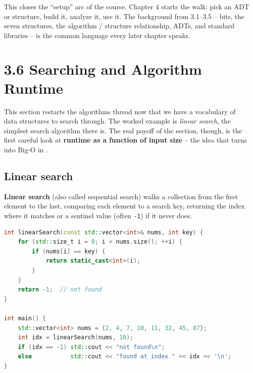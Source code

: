 \documentclass[11pt]{article}
\begin{document}
\begin{notebox}
This closes the ``setup'' arc of the course. Chapter 4 starts the
walk: pick an ADT or structure, build it, analyze it, use it. The
background from 3.1--3.5 -- bits, the seven structures, the
algorithm / structure relationship, ADTs, and standard libraries --
is the common language every later chapter speaks.
\end{notebox}

\section{3.6 Searching and Algorithm Runtime}

This section restarts the algorithms thread now that we have a
vocabulary of data structures to search through. The worked example
is \emph{linear search}, the simplest search algorithm there is. The
real payoff of the section, though, is the first careful look at
\textbf{runtime as a function of input size} -- the idea that turns
into Big-O in .

\subsection{Linear search}

\begin{defnbox}
\textbf{Linear search} (also called sequential search) walks a
collection from the first element to the last, comparing each
element to a search key, returning the index where it matches or a
sentinel value (often \texttt{-1}) if it never does.
\end{defnbox}

\begin{examplebox}
\begin{lstlisting}[basicstyle=\ttfamily\small,frame=single,language=C++]
int linearSearch(const std::vector<int>& nums, int key) {
    for (std::size_t i = 0; i < nums.size(); ++i) {
        if (nums[i] == key) {
            return static_cast<int>(i);
        }
    }
    return -1;  // not found
}

int main() {
    std::vector<int> nums = {2, 4, 7, 10, 11, 32, 45, 87};
    int idx = linearSearch(nums, 10);
    if (idx == -1) std::cout << "not found\n";
    else           std::cout << "found at index " << idx << '\n';
}
\end{lstlisting}
\end{examplebox}
\end{document}
